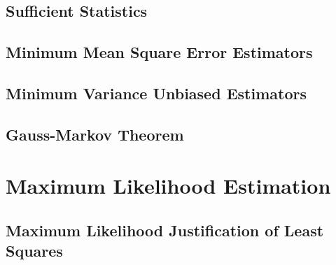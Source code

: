 \documentclass[11pt]{report} %
\begin{document}
\subsection{Sufficient Statistics}

\subsection{Minimum Mean Square Error Estimators}

\subsection{Minimum Variance Unbiased Estimators}

\subsection{Gauss-Markov Theorem}

\section{Maximum Likelihood Estimation}

\subsection{Maximum Likelihood Justification of Least Squares}
\end{document}
